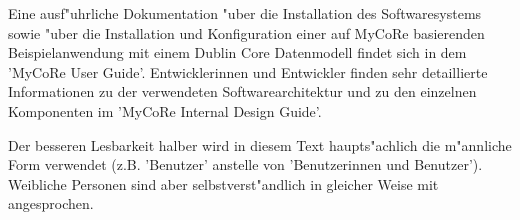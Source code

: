 Eine ausf"uhrliche Dokumentation "uber die Installation des Softwaresystems sowie 
"uber die Installation und Konfiguration einer auf MyCoRe basierenden
Beispielanwendung mit einem Dublin Core Datenmodell findet sich in dem
'MyCoRe User Guide'.
Entwicklerinnen und Entwickler finden sehr detaillierte Informationen
zu der verwendeten Softwarearchitektur und zu den einzelnen Komponenten
im 'MyCoRe Internal Design Guide'.

Der besseren Lesbarkeit halber wird in diesem Text haupts"achlich die m"annliche 
Form verwendet (z.B. 'Benutzer' anstelle von 'Benutzerinnen und Benutzer'). 
Weibliche Personen sind aber selbstverst"andlich in gleicher Weise mit angesprochen.
 
